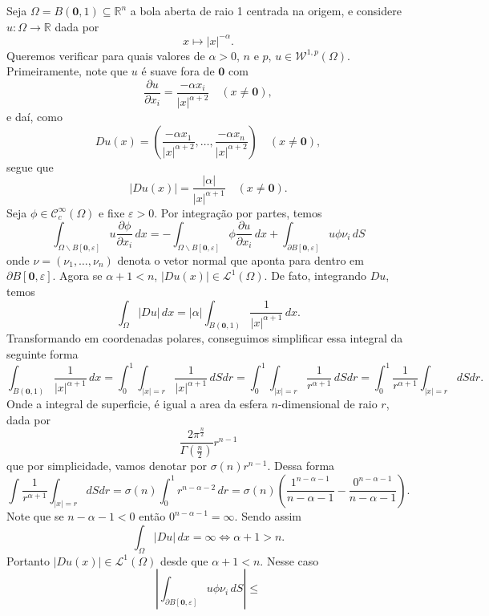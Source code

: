 \documentclass[a4paper, 11pt]{book}
\theoremstyle{definition}
\newcommand{\bR}{\mathbb{R}}
\newcommand{\cC}{\mathcal{C}}
\newcommand{\cL}{\mathcal{L}}
\newcommand{\cW}{\mathcal{W}}
\begin{document}
\begin{ex}
    Seja $\Omega = B(\mathbf{0},1) \subseteq \bR^n$ a bola aberta de raio 1 centrada na origem, e considere $u : \Omega \to \bR$ dada por
    \[
        x \mapsto |x|^{-\alpha}.
    \]
    Queremos verificar para quais valores de $\alpha > 0$, $n$ e $p$, $u \in \cW^{1,p}(\Omega)$.
    Primeiramente, note que $u$ é suave fora de $\mathbf{0}$ com
    \[
        \dfrac{\partial u}{\partial x_i} = \frac{-\alpha x_i}{|x|^{\alpha + 2}} \quad (x \neq \mathbf{0}),
    \]
    e daí, como
    \[
        Du(x) = \left(\frac{-\alpha x_1}{|x|^{\alpha + 2}},\dots,\frac{-\alpha x_n}{|x|^{\alpha + 2}}  \right) \quad (x \neq \mathbf{0}),
    \]
    segue que
    \[
        |Du(x)| = \frac{|\alpha|}{|x|^{\alpha + 1}} \quad (x \neq \mathbf{0}).
    \]
    Seja $\phi \in \cC^\infty_c(\Omega)$ e fixe $\varepsilon > 0$. Por integração por partes, temos
    \[
        \int_{\Omega \smallsetminus B[\mathbf{0}, \varepsilon]} u \dfrac{\partial \phi}{\partial x_i} \, dx = -\int_{\Omega \smallsetminus B[\mathbf{0}, \varepsilon]} \phi \dfrac{\partial u}{\partial x_i} \,dx + \int_{\partial B[\mathbf{0},\varepsilon]} u \phi \nu_i \,dS
    \]
    onde $\nu = (\nu_1,\dots,\nu_n)$ denota o vetor normal que aponta para dentro em $\partial B[\mathbf{0},\varepsilon]$.
    Agora se $\alpha + 1 < n$, $|Du(x)| \in \cL^1(\Omega)$.
    De fato, integrando $Du$, temos
    \[
        \int_\Omega |Du| \,dx = |\alpha|\int_{B(\mathbf{0},1)} \frac{1}{|x|^{\alpha+1}} \,dx.
    \]
    Transformando em coordenadas polares, conseguimos simplificar essa integral da seguinte forma
    \[
        \int_{B(\mathbf{0},1)} \frac{1}{|x|^{\alpha+1}} \,dx =  \int_0^1 \int_{|x| = r} \frac{1}{|x|^{\alpha + 1}} \,dS dr = \int_0^1 \int_{|x|= r} \frac{1}{r^{\alpha + 1}} \, dS dr = \int_0^1 \frac{1}{r^{\alpha+1}}  \int_{|x| = r} dS dr.
    \]
    Onde a integral de superficie, é igual a area da esfera $n$-dimensional de raio $r$, dada por
    \[
        \frac{2\pi^{\frac{n}{2}}}{\Gamma(\frac{n}{2})}r^{n-1}
    \]
    que por simplicidade, vamos denotar por $\sigma(n) r^{n-1}$. Dessa forma
    \[
        \int \frac{1}{r^{\alpha+1}}  \int_{|x| = r} dS dr = \sigma(n)\int_0^1 r^{n-\alpha-2} \,dr = \sigma(n)\left(\frac{1^{n-\alpha-1}}{n-\alpha -1} - \frac{0^{n-\alpha-1}}{n-\alpha-1}\right).
    \]
    Note que se $n - \alpha - 1 < 0$ então $0^{n-\alpha-1} = \infty$. Sendo assim
    \[
        \int_\Omega |Du| \, dx = \infty \iff \alpha + 1 > n.
    \]
    Portanto $|Du(x)| \in \cL^1(\Omega)$ desde que $\alpha + 1 < n$.
    Nesse caso
    \[
        \left| \int_{\partial B[\mathbf{0},\varepsilon]} u \phi \nu_i \,dS \right| \leqslant 
\]
\end{ex}
\end{document}
